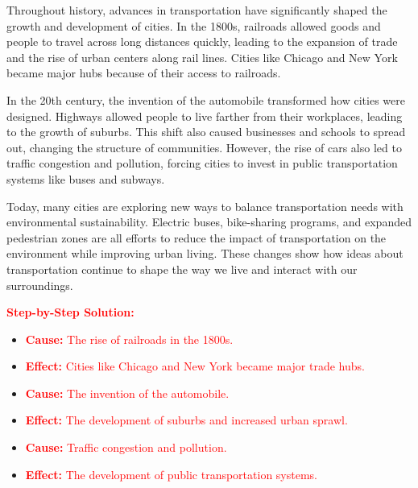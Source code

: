 \documentclass[12pt]{article}
\begin{document}
\begin{tcolorbox}[colframe=black!60, colback=white, 
coltitle=black, colbacktitle=black!15, fonttitle=\bfseries\Large, 
title=Text: The Impact of Transportation on Urban Growth, halign title=center, left=10pt, right=10pt, top=10pt, bottom=15pt]
Throughout history, advances in transportation have significantly shaped the growth and development of cities. In the 1800s, railroads allowed goods and people to travel across long distances quickly, leading to the expansion of trade and the rise of urban centers along rail lines. Cities like Chicago and New York became major hubs because of their access to railroads.

In the 20th century, the invention of the automobile transformed how cities were designed. Highways allowed people to live farther from their workplaces, leading to the growth of suburbs. This shift also caused businesses and schools to spread out, changing the structure of communities. However, the rise of cars also led to traffic congestion and pollution, forcing cities to invest in public transportation systems like buses and subways.

Today, many cities are exploring new ways to balance transportation needs with environmental sustainability. Electric buses, bike-sharing programs, and expanded pedestrian zones are all efforts to reduce the impact of transportation on the environment while improving urban living. These changes show how ideas about transportation continue to shape the way we live and interact with our surroundings.

\textcolor{red}{\textbf{Step-by-Step Solution:}}
\begin{itemize}
    \item \textbf{\textcolor{red}{Cause:}} \textcolor{red}{The rise of railroads in the 1800s.}
    \item \textbf{\textcolor{red}{Effect:}} \textcolor{red}{Cities like Chicago and New York became major trade hubs.}  
    \item \textbf{\textcolor{red}{Cause:}} \textcolor{red}{The invention of the automobile.}  
    \item \textbf{\textcolor{red}{Effect:}} \textcolor{red}{The development of suburbs and increased urban sprawl.}  
    \item \textbf{\textcolor{red}{Cause:}} \textcolor{red}{Traffic congestion and pollution.}  
    \item \textbf{\textcolor{red}{Effect:}} \textcolor{red}{The development of public transportation systems.}  
\end{itemize}
\end{tcolorbox}
\end{document}
